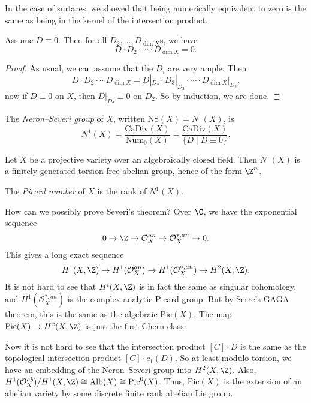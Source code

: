 \documentclass[a4paper]{article}
\newcommand\CaDiv{\mathrm{CaDiv}}
\newcommand\Pic{\mathrm{Pic}}
\newcommand\Num{\mathrm{Num}}
\newcommand\NS{\mathrm{NS}}
\begin{document}
In the case of surfaces, we showed that being numerically equivalent to zero is the same as being in the kernel of the intersection product.

\begin{lemma}
  Assume $D \equiv 0$. Then for all $D_2, \ldots, D_{\dim X}$s, we have
  \[
    D \cdot D_2 \cdot \cdots \cdot D_{\dim X} = 0.
  \]
\end{lemma}

\begin{proof}
  As usual, we can assume that the $D_i$ are very ample. Then
  \[
    D \cdot D_2 \cdot \cdots D_{\dim X} = D|_{D_2} \cdot D_3|_{D_2} \cdot \cdots \cdot D_{\dim X}|_{D_2}.
  \]
  now if $D \equiv 0$ on $X$, then $D|_{D_2} \equiv 0$ on $D_2$. So by induction, we are done.
\end{proof}

\begin{defi}
  The \emph{Neron--Severi group} of $X$, written $\NS(X) = N^1(X)$, is
  \[
    N^1(X) = \frac{\CaDiv(X)}{\Num_0(X)} = \frac{\CaDiv(X)}{\{D \mid D \equiv 0\}}.
  \]
\end{defi}

\begin{thm}[Severi]
  Let $X$ be a projective variety over an algebraically closed field. Then $N^1(X)$ is a finitely-generated torsion free abelian group, hence of the form $\Z^n$.
\end{thm}
\begin{defi}
  The \emph{Picard number} of $X$ is the rank of $N^1(X)$.
\end{defi}

How can we possibly prove Severi's theorem? Over $\C$, we have the exponential sequence
\[
  0 \to \Z \to \mathcal{O}_X^{an} \to \mathcal{O}_X^{*, an} \to 0.
\]
This gives a long exact sequence
\[
  H^1(X, \Z) \to H^1(\mathcal{O}_X^{an}) \to H^1(\mathcal{O}_X^{*, an}) \to H^2(X, \Z).
\]
It is not hard to see that $H^i(X, \Z)$ is in fact the same as singular cohomology, and $H^1(\mathcal{O}_X^{*, an})$ is the complex analytic Picard group. But by Serre's GAGA theorem, this is the same as the algebraic $\Pic(X)$. The map $\Pic(X) \to H^2(X, \Z)$ is just the first Chern class.

Now it is not hard to see that the intersection product $[C]\cdot D$ is the same as the topological intersection product $[C] \cdot c_1(D)$. So at least modulo torsion, we have an embedding of the Neron--Severi group into $H^2(X, \Z)$. Also, $H^1(\mathcal{O}_X^{ab})/H^1(X, \Z) \cong \mathrm{Alb}(X) \cong \Pic^0(X)$. Thus, $\Pic(X)$ is the extension of an abelian variety by some discrete finite rank abelian Lie group.
\end{document}
